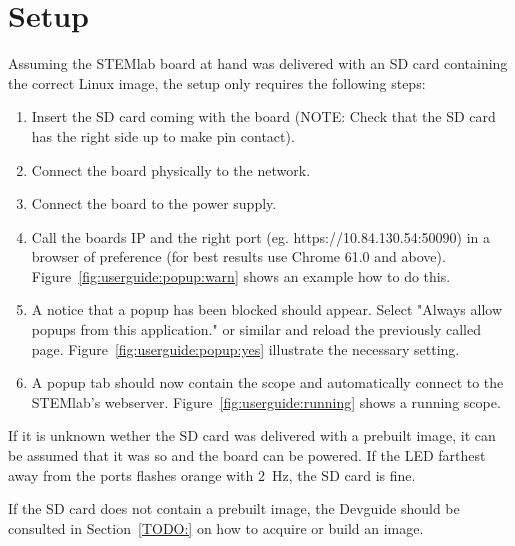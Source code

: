 \chapter{Setup} %
\label{ch:userguide:setup}

Assuming the STEMlab board at hand was delivered with an SD card containing the correct Linux image, the setup only requires the following steps:

\begin{enumerate}
    \item Insert the SD card coming with the board (NOTE: Check that the SD card has the right side up to make pin contact).
    \item Connect the board physically to the network.
    \item Connect the board to the power supply.
    \item Call the boards IP and the right port (eg. https://10.84.130.54:50090) in a browser of preference (for best results use Chrome 61.0 and above). Figure~\ref{fig:userguide:popup:warn} shows an example how to do this.
    \item A notice that a popup has been blocked should appear. Select "Always allow popups from this application." or similar and reload the previously called page. Figure~\ref{fig:userguide:popup:yes} illustrate the necessary setting.
    \item A popup tab should now contain the scope and automatically connect to the STEMlab's webserver. Figure~\ref{fig:userguide:running} shows a running scope.
\end{enumerate}

If it is unknown wether the SD card was delivered with a prebuilt image, it can be assumed that it was so and the board can be powered. If the LED farthest away from the ports flashes orange with \SI{2}{\Hz}, the SD card is fine.

If the SD card does not contain a prebuilt image, the Devguide should be consulted in Section~\ref{TODO:} on how to acquire or build an image.

